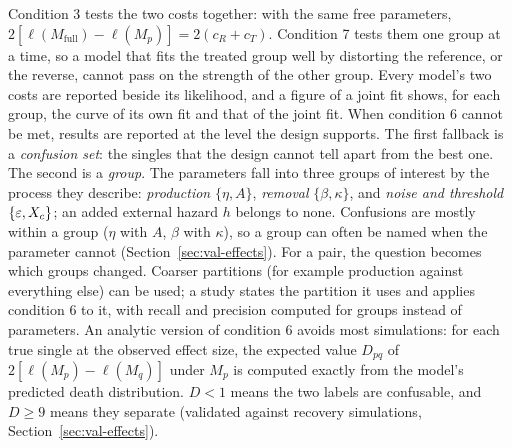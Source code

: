 Condition 3 tests the two costs together: with the same free parameters, $2[\ell(M_\text{full})-\ell(M_p)]=2(c_R+c_T)$.
Condition 7 tests them one group at a time, so a model that fits the treated group well by distorting the reference,
or the reverse, cannot pass on the strength of the other group. Every model's two costs are reported beside its
likelihood, and a figure of a joint fit shows, for each group, the curve of its own fit and that of the joint fit.
When condition 6 cannot be met, results are reported at the level the design supports. The first fallback is a
\emph{confusion set}: the singles that the design cannot tell apart from the best one. The second is a \emph{group}.
The parameters fall into three groups of interest by the process they describe: \emph{production} $\{\eta, A\}$,
\emph{removal} $\{\beta, \kappa\}$, and \emph{noise and threshold} $\{\varepsilon, X_c\}$; an added external hazard $h$ belongs
to none. Confusions are mostly within a group ($\eta$ with $A$, $\beta$ with $\kappa$), so a group can often be named when
the parameter cannot (Section~\ref{sec:val-effects}). For a pair, the question becomes which groups changed. Coarser
partitions (for example production against everything else) can be used; a study states the partition it uses and
applies condition 6 to it, with recall and precision computed for groups instead of parameters. An analytic version of condition 6 avoids most simulations: for each true single at the observed effect size, the
expected value $D_{pq}$ of $2[\ell(M_p)-\ell(M_q)]$ under $M_p$ is computed exactly from the model's predicted death
distribution. $D<1$ means the two labels are confusable, and $D\ge 9$ means they separate (validated against
recovery simulations, Section~\ref{sec:val-effects}).

